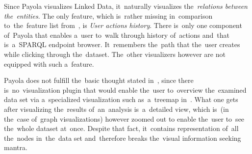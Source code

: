 Since Payola visualizes Linked Data, it~naturally visualizes the~\emph{relations between the~entities}.
The only feature, which is~rather missing in~comparison to~the~feature list from~\cite{mantra}, is
\emph{User actions history}.
There is~only one component of~Payola that enables a~user to~walk through 
history of~actions and~that is~a~SPARQL endpoint browser. It~remembers the~path 
that the~user creates while clicking through the~dataset. The~other visualizers 
however are not equipped with such a~feature.

Payola does not fulfill the~basic thought stated in~\cite{mantra}, since 
there is~no~visualization plugin that would enable the~user to~overview the~examined data set via a~specialized visualization such as~a~treemap 
in~\cite{lodvis}. What one gets after visualizing the~results of~an~analysis is~a~detailed view, which is~(in the~case of~graph visualizations) however zoomed out
to enable the~user to~see the~whole dataset at~once. Despite that fact, it~contains representation of~all the~nodes in~the~data set and~therefore breaks 
the~visual information seeking mantra.
